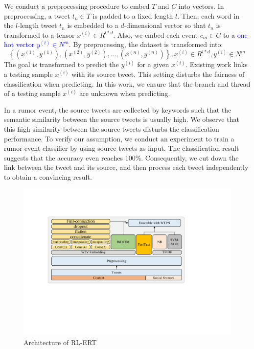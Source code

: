 We conduct a preprocessing procedure to embed $T$ and $C$ into vectors. In preprocessing, a tweet $t_n \in T $ is padded to a fixed length $l$. Then, each word in the $l$-length tweet $t_n$ is embedded to a $d$-dimensional vector so that $t_n$ is transformed to a tensor $x^{(i)} \in R^{l*d}$. Also, we embed each event $c_m \in C$ to a \textcolor{blue}{one-hot vector $y^{(i)} \in N^m$}. By preprocessing, the dataset is transformed into: $$\left\{ (x^{(1)}, y^{(1)}), (x^{(2)}, y^{(2)}),..., (x^{(n)}, y^{(n)}) \right\}, x^{(i)} \in R^{l*d}, y^{(i)} \in N^m $$ The goal is transformed to predict the $y^{(i)}$ for a given $x^{(i)}$. Existing work \cite{DBLP:conf/www/ChengNB20} links a testing sample $x^{(i)}$ with its source tweet. This setting disturbs the fairness of classification when predicting. In this work, we ensure that the branch and thread of a testing sample $x^{(i)}$ are unknown when predicting.

In a rumor event, the source tweets are collected by keywords such that the semantic similarity between the source tweets is usually high. We observe that this high similarity between the source tweets disturbs the classification performance. To verify our assumption, we conduct an experiment to train a rumor event classifier by using source tweets as input. The classification result suggests that the accuracy even reaches 100\%. Consequently, we cut down the link between the tweet and its source, and then process each tweet independently to obtain a convincing result.

\begin{figure}[htbp]
	\hspace{0ex}
	\vspace{0ex}
	\centering
	\includegraphics[width = \textwidth]{fig/structure}
	\caption{Architecture of RL-ERT}
	\label{fig:architecture}
\end{figure} 


